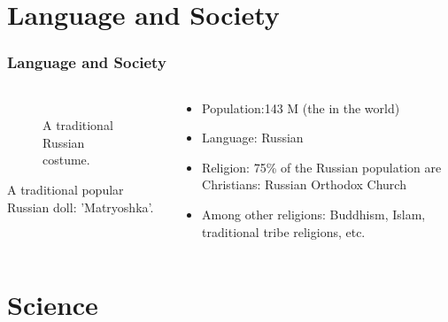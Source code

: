 \documentclass[pdflatex,compress,8pt,
	xcolor={dvipsnames,dvipsnames,svgnames,x11names,table},
	hyperref={colorlinks = true,breaklinks = true, urlcolor = NavyBlue, breaklinks = true}]{beamer}
\begin{document}
\section{Language and Society}
\begin{frame}\frametitle{Language and Society}
\begin{minipage}[0.4\textheight]{\textwidth}
\begin{columns}[T]
\begin{column}{0.4\textwidth}
\begin{figure}[H]
	\centering
		\\
		A traditional Russian costume.
			\hspace{5mm}
\end{figure}
 A traditional popular Russian doll: 'Matryoshka'.
\end{column}
\begin{column}{0.6\textwidth}
\vspace{2em} 
\begin{itemize}
	\item Population:143 M (the  in the world)
	\item Language: Russian
	\item Religion: 75\% of the Russian population are Christians: Russian Orthodox Church
	\item Among other religions: Buddhism, Islam, traditional tribe religions, etc.
\end{itemize}
\begin{figure}[H]
	\centering
			\hspace{5mm}
\end{figure}
\end{column}
\end{columns}
\end{minipage}
\end{frame}

\section{Science}
\end{document}
